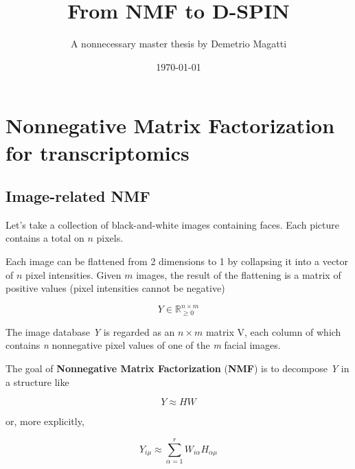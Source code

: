 \documentclass[11pt,a4paper]{article}
\title{From NMF to D-SPIN}
\author{A nonnecessary master thesis by Demetrio Magatti}
\date{\today}
\begin{document}
\thispagestyle{empty}
\maketitle
\thispagestyle{empty}
\clearpage
\thispagestyle{empty}

\newpage

\thispagestyle{empty}
\tableofcontents
\clearpage


\newpage

\section{Nonnegative Matrix Factorization for transcriptomics}


\subsection{Image-related NMF}

Let's take a collection of black-and-white images containing faces. Each picture contains a total on $n$ pixels.

Each image can be flattened from 2 dimensions to 1 by collapsing it into a vector of $n$ pixel intensities. Given $m$ images, the result of the flattening is a matrix of positive values (pixel intensities cannot be negative)

\[
Y \in \mathbb{R}_{\geq 0}^{n\times m}
\]

The image database \textit{Y} is regarded as an $n \times m$ matrix V, each column of which contains \textit{n} nonnegative pixel
values of one of the \textit{m} facial images. 

The goal of \textbf{Nonnegative Matrix Factorization} (\textbf{NMF}) is to decompose \textit{Y} in a structure like 

\[
Y \approx HW
\]

or, more explicitly,

\[ 
Y_{i \mu} \approx \sum_{\alpha = 1}^r W_{i \alpha} H_{\alpha \mu}
\]
\end{document}
